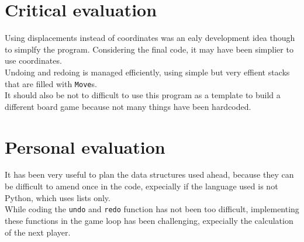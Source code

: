\documentclass[10pt, a4paper]{article}
\begin{document}
	\section{Critical evaluation}
	Using displacements instead of coordinates was an ealy development idea though to simplfy the program. Considering the final code, it may have been simplier to use coordinates.\\
	Undoing and redoing is managed efficiently, using simple but very effient stacks that are filled with \texttt{Move}s.\\
	It should also be not to difficult to use this program as a template to build a different board game because not many things have been hardcoded.
	
	\section{Personal evaluation}
	It has been very useful to plan the data structures used ahead, because they can be difficult to amend once in the code, expecially if the language used is not Python, which uses lists only.\\
	While coding the \texttt{undo} and \texttt{redo} function has not been too difficult, implementing these functions in the game loop has been challenging, expecially the calculation of the next player.
		
\end{document}
